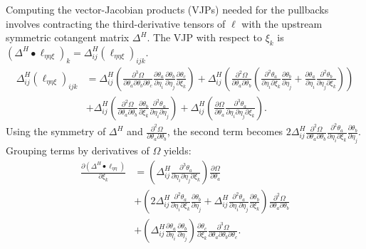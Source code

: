 \documentclass{article}
\begin{document}
Computing the vector-Jacobian products (VJPs) needed for the pullbacks involves contracting the third-derivative tensors of $\ell$ with the upstream symmetric cotangent matrix $\Delta^H$.
The VJP with respect to $\xi_k$ is $(\Delta^H \bullet \ell_{\eta\eta\xi})_k = \Delta^H_{ij} (\ell_{\eta\eta\xi})_{ijk}$.
%
\begin{align}
  \Delta^H_{ij} (\ell_{\eta\eta\xi})_{ijk} & = \Delta^H_{ij} \left( \frac{\partial^3 \Omega}{\partial \theta_a \partial \theta_b \partial \theta_c} \frac{\partial \theta_a}{\partial \eta_i} \frac{\partial \theta_b}{\partial \eta_j} \frac{\partial \theta_c}{\partial \xi_k} \right) + \Delta^H_{ij} \left( \frac{\partial^2 \Omega}{\partial \theta_a \partial \theta_b} \left( \frac{\partial^2 \theta_a}{\partial \eta_i \partial \xi_k} \frac{\partial \theta_b}{\partial \eta_j} + \frac{\partial \theta_a}{\partial \eta_i} \frac{\partial^2 \theta_b}{\partial \eta_j \partial \xi_k} \right) \right) \\
                                           & + \Delta^H_{ij} \left( \frac{\partial^2 \Omega}{\partial \theta_a \partial \theta_b} \frac{\partial \theta_b}{\partial \xi_k} \frac{\partial^2 \theta_a}{\partial \eta_i \partial \eta_j} \right) + \Delta^H_{ij} \left( \frac{\partial \Omega}{\partial \theta_a} \frac{\partial^3 \theta_a}{\partial \eta_i \partial \eta_j \partial \xi_k} \right).
\end{align}
%
Using the symmetry of $\Delta^H$ and $\frac{\partial^2 \Omega}{\partial \theta_a \partial \theta_b}$, the second term becomes $2 \Delta^H_{ij} \frac{\partial^2 \Omega}{\partial \theta_a \partial \theta_b} \frac{\partial^2 \theta_a}{\partial \eta_i \partial \xi_k} \frac{\partial \theta_b}{\partial \eta_j}$.
Grouping terms by derivatives of $\Omega$ yields:
%
\begin{align}
  \frac{\partial (\Delta^H \bullet \ell_{\eta\eta})}{\partial \xi_k} & = \left( \Delta^H_{ij} \frac{\partial^3 \theta_a}{\partial \eta_i \partial \eta_j \partial \xi_k} \right) \frac{\partial \Omega}{\partial \theta_a}                                                                                                                                                                      \\
                                                                     & + \left( 2 \Delta^H_{ij} \frac{\partial^2 \theta_a}{\partial \eta_i \partial \xi_k} \frac{\partial \theta_b}{\partial \eta_j} + \Delta^H_{ij} \frac{\partial^2 \theta_a}{\partial \eta_i \partial \eta_j} \frac{\partial \theta_b}{\partial \xi_k} \right) \frac{\partial^2 \Omega}{\partial \theta_a \partial \theta_b} \\
                                                                     & + \left( \Delta^H_{ij} \frac{\partial \theta_a}{\partial \eta_i} \frac{\partial \theta_b}{\partial \eta_j} \right) \frac{\partial \theta_c}{\partial \xi_k} \frac{\partial^3 \Omega}{\partial \theta_a \partial \theta_b \partial \theta_c}.
\end{align}
\end{document}
